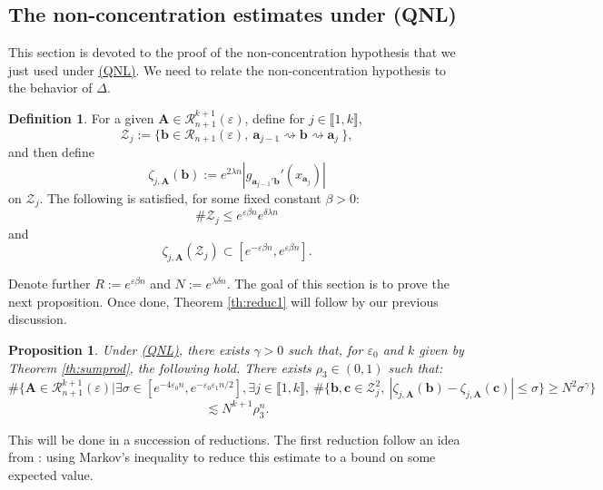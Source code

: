\documentclass[a4paper]{article}
\newtheorem{proposition}[theorem]{Proposition}
\theoremstyle{definition}
\newtheorem{definition}{Definition}[section]
\begin{document}
\subsection{The non-concentration estimates under (QNL)}\label{subsection:nonconunderQNL}

This section is devoted to the proof of the non-concentration hypothesis that we just used under \hyperref[QNL]{(QNL)}. We need to relate the non-concentration hypothesis to the behavior of $\Delta$.


\begin{definition}
For a given $\mathbf{A} \in \mathcal{R}_{n+1}^{k+1}(\varepsilon)$, define for $j \in \llbracket 1, k \rrbracket$,  $$ \mathcal{Z}_j := \{ \mathbf{b} \in \mathcal{R}_{n+1}(\varepsilon) , \ \mathbf{a}_{j-1} \rightsquigarrow \mathbf{b} \rightsquigarrow \mathbf{a}_j \  \}, $$
and then define $$\zeta_{j,\mathbf{A}}(\mathbf{b}) := e^{2 \lambda n} |g_{\mathbf{a}_{j-1}' \mathbf{b}}'(x_{{\mathbf{a}}_j})|$$ on $\mathcal{Z}_j$. The following is satisfied, for some fixed constant $\beta>0$:
 $$\# \mathcal{Z}_j \leq e^{\varepsilon \beta n} e^{ \delta \lambda n} $$
 and
$$ \zeta_{j,\mathbf{A}}( \mathcal{Z}_j ) \subset \left[ e^{- \varepsilon \beta n} , e^{\varepsilon \beta n} \right] .$$
\end{definition}
Denote further $R:=e^{\varepsilon \beta n}$ and $N:= e^{\lambda \delta n} $. The goal of this section is to prove the next proposition. Once done, Theorem \ref{th:reduc1} will follow by our previous discussion.

\begin{proposition}\label{prop:ncQNL}
Under \hyperref[QNL]{(QNL)}, there exists $\gamma>0$ such that, for $\varepsilon_0$ and $k$ given by Theorem \ref{th:sumprod}, the following hold. There exists $\rho_3 \in (0,1)$ such that:
$$ \#\Big\{ \mathbf{A} \in \mathcal{R}_{n+1}^{k+1}(\varepsilon) \Big|  \exists \sigma \in [e^{-4 \varepsilon_0 n}, e^{- \varepsilon_0 \varepsilon_1 n /2}], \exists j \in \llbracket 1,k \rrbracket, \ \# \{\mathbf{b} , \mathbf{c} \in \mathcal{Z}^2_j , \ |\zeta_{j,\mathbf{A}}(\mathbf{b}) - \zeta_{j,\mathbf{A}}(\mathbf{c})| \leq \sigma \} \geq N^2 \sigma^{\gamma} \Big\} $$ $$ \lesssim N^{k+1}  \rho_3^n. $$
\end{proposition}

This will be done in a succession of reductions. The first reduction follow an idea from \cite{BD17}: using Markov's inequality to reduce this estimate to a bound on some expected value. 
\end{document}
